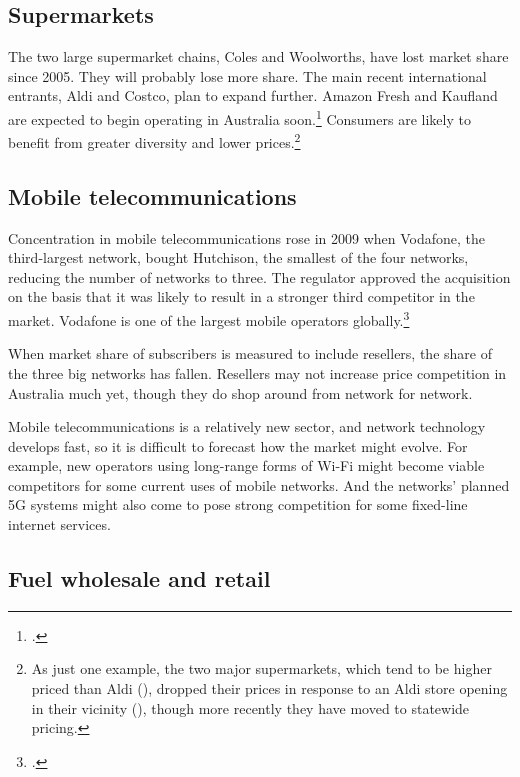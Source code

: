 \subsection{Supermarkets}

The two large supermarket chains, Coles and Woolworths, have lost market share since 2005. They will probably lose more share. The main recent international entrants, Aldi and Costco, plan to expand further. Amazon Fresh and Kaufland are expected to begin operating in Australia soon.\footcites{Kaufland_2017}{AmazonFresh_2017} 
Consumers are likely to benefit from greater diversity and lower prices.\footnote{As just one example, the two major supermarkets, which tend to be higher priced than Aldi (\textcite{Choice-supermarket-want-to-spend-less}), dropped their prices in response to an Aldi store opening in their vicinity (\textcite{ACCC-grocery-2008}), though more recently they have moved to statewide pricing.}


\subsection{Mobile telecommunications}

Concentration in mobile telecommunications rose in 2009 when Vodafone, the third-largest network, bought Hutchison, the smallest of the four networks, reducing the number of networks to three. The regulator approved the acquisition on the basis that it was likely to result in a stronger third competitor in the market. Vodafone is one of the largest mobile operators globally.\footcite{ACCC_mobile_2009} 

When market share of subscribers is measured to include resellers, the share of the three big networks has fallen. Resellers may not increase price competition in Australia much yet, though they do shop around from network for network. 

Mobile telecommunications is a relatively new sector, and network technology develops fast, so it is difficult to forecast how the market might evolve. For example, new operators using long-range forms of Wi-Fi might become viable competitors for some current uses of mobile networks. And the networks' planned 5G systems might also come to pose strong competition for some fixed-line internet services.

\subsection{Fuel wholesale and retail}

